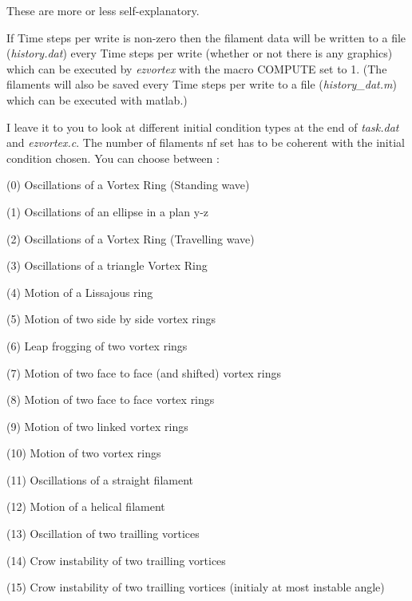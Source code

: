 These are more or less self-explanatory.  

If {\sf  Time steps per write} is non-zero then the filament data will be written to a file ({\em history.dat}) every {\sf  Time steps per write} (whether or not there is any graphics)  which can be executed  by {\em ezvortex} with the macro {\sf COMPUTE} set to 1. (The filaments will also be saved every {\sf Time steps per write} to a file ({\em history\_dat.m}) which can be executed with matlab.)
 

I leave it to you to look at different initial condition types at 
the end of {\em task.dat} and {\em ezvortex.c}. The number of filaments {\sf nf} set has to 
be coherent with the initial condition chosen. You can choose between :
\begin{list}{dummy}
{\partopsep=-10pt\parsep=-10pt\itemsep=12pt}

\item[(0)] Oscillations of a Vortex Ring (Standing wave)

\item[(1)] Oscillations of an ellipse in a plan y-z

\item[(2)] Oscillations of a Vortex Ring (Travelling wave)

\item[(3)] Oscillations of a triangle Vortex Ring 

\item[(4)] Motion of a Lissajous  ring

\item[(5)] Motion of two side by side  vortex rings

\item[(6)] Leap frogging of two vortex rings

\item[(7)] Motion of two face to face (and shifted) vortex rings

\item[(8)] Motion of two face to face vortex rings

\item[(9)] Motion of two linked vortex rings

\item[(10)] Motion of two vortex rings

\item[(11)] Oscillations of a straight filament

\item[(12)] Motion of a helical filament

\item[(13)] Oscillation of two trailling vortices

\item[(14)] Crow instability  of two trailling vortices

\item[(15)] Crow instability  of two trailling vortices (initialy at most instable angle)

\end{list} 


